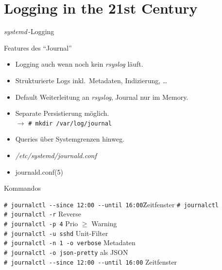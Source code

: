 \section[Logging]{Logging in the 21st Century}

\begin{frame}{\emph{systemd}\,-Logging}
\begin{block}{Features des ``Journal''}
\begin{itemize}
\item Logging auch wenn noch kein \emph{rsyslog} läuft.
\item Strukturierte Logs inkl.~Metadaten, Indizierung, \dots
\item Default Weiterleitung an \emph{rsyslog}, Journal nur im Memory.
\item Separate Persistierung möglich. \\ $\rightarrow$ \texttt{\# mkdir
/var/log/journal}
\item Queries über Systemgrenzen hinweg.
\item \emph{/etc/systemd/journald.conf}
\item journald.conf(5)
\end{itemize}
\end{block}

\framebreak

\begin{block}{Kommandos}
\small
\begin{tabbing}
\quad\=\texttt{\# journalctl -{}-since 12:00 -{}-until 16:00}\quad\= Zeitfenster\kill
\>\texttt{\# journalctl} \> \\
\>\texttt{\# journalctl -r} \> Reverse \\
\>\texttt{\# journalctl -p 4} \> Prio $\ge$ Warning \\
\>\texttt{\# journalctl -u sshd} \> Unit-Filter \\
\>\texttt{\# journalctl -n 1 -o verbose} \> Metadaten \\
\>\texttt{\# journalctl -o json-pretty} \> als JSON \\
\>\texttt{\# journalctl -{}-since 12:00 -{}-until 16:00} \> Zeitfenster 
\end{tabbing}
\end{block}
\end{frame}



